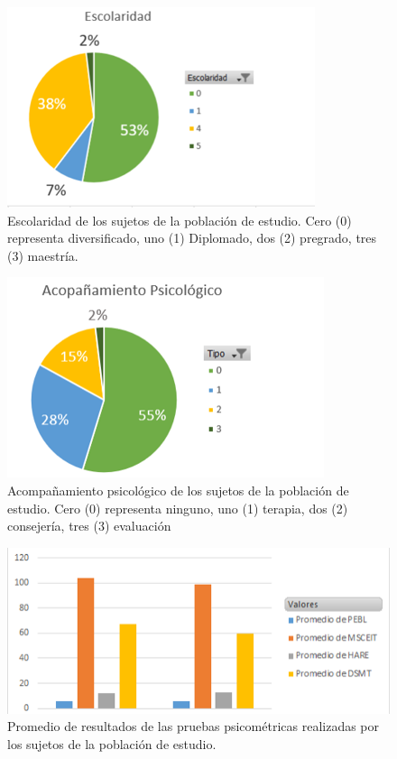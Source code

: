 \begin{figure}
    \centering
    \includegraphics[scale=1]{figuras/Imagen17.png}
    \caption{Escolaridad de los sujetos de la población de estudio. Cero (0) representa diversificado, uno (1) Diplomado, dos (2) pregrado, tres (3) maestría. }
    \label{fig:my_label}
\end{figure}
\begin{figure}
    \centering
    \includegraphics[scale=1]{figuras/Imagen18.png}
    \caption{Acompañamiento psicológico de los sujetos de la población de estudio. Cero (0) representa ninguno, uno (1) terapia, dos (2) consejería, tres (3) evaluación}
    \label{fig:my_label}
\end{figure}
\begin{figure}
    \centering
    \includegraphics[scale=0.70]{figuras/Imagen19.png}
    \caption{Promedio de resultados de las pruebas psicométricas realizadas por los sujetos de la población de estudio.}
    \label{fig:my_label}
\end{figure}
